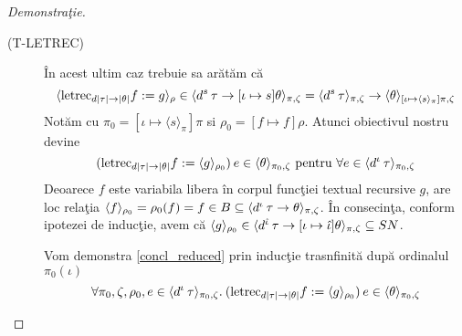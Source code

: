 \begin{proof}[Demonstra\c tie]
\begin{description}
  \item[{\scriptsize (T-LETREC)}] \^ In acest ultim caz trebuie sa ar\u at\u am c\u a
    \begin{equation} \label{concl}
        \langle \text{letrec}_{d|\tau| \to |\theta|}f := g \rangle_{\rho} \in
        \langle d^s\hspace{2pt} \tau \to [\iota \mapsto s] \theta \rangle_{\pi,\zeta} =
        \langle d^s\hspace{2pt} \tau  \rangle_{\pi,\zeta}  \to \langle \theta  \rangle_{[\iota \mapsto \langle s \rangle_{\pi}] \pi,\zeta}
    \end{equation}
    Not\u am cu $\pi_0 = [\iota \mapsto \langle s \rangle_{\pi}]\pi$ si $\rho_0 = [f \mapsto f]\rho$. Atunci obiectivul nostru devine
    \begin{equation*}\label{concl_reduced}
        (\text{letrec}_{d|\tau| \to |\theta|} f := \langle g \rangle_{\rho_0}) \hspace{2pt} e \in \langle \theta \rangle_{\pi_0,\zeta}
        \text{  pentru  } \forall e \in \langle d^\iota\hspace{2pt} \tau \rangle_{\pi_0,\zeta}
    \end{equation*}
    Deoarece $f$ este variabila libera \^ in corpul func\c tiei textual recursive $g$, are loc rela\c tia $\langle f \rangle_{\rho_0} = \rho_0(f) = f \in B \subseteq \langle d^\iota\hspace{2pt}\tau\to\theta \rangle_{\pi,\zeta}$. \^ In consecin\c ta, conform ipotezei de induc\c tie, avem c\u a $\langle g \rangle_{\rho_0} \in \langle d^{\hat{\iota}}\hspace{2pt}\tau\to [\iota \mapsto \hat{\iota}]\theta \rangle_{\pi,\zeta} \subseteq SN$.

    Vom demonstra \eqref{concl_reduced} prin induc\c tie trasnfinit\u a dup\u a ordinalul $\pi_0(\iota)$
    \begin{equation}
        \forall \pi_0,\zeta,\rho_0,e \in \langle d^\iota\hspace{2pt} \tau \rangle_{\pi_0,\zeta}.\:  (\text{letrec}_{d|\tau| \to |\theta|} f := \langle g \rangle_{\rho_0}) \hspace{2pt} e \in \langle \theta \rangle_{\pi_0,\zeta}
    \end{equation}
\end{description}
\end{proof}
